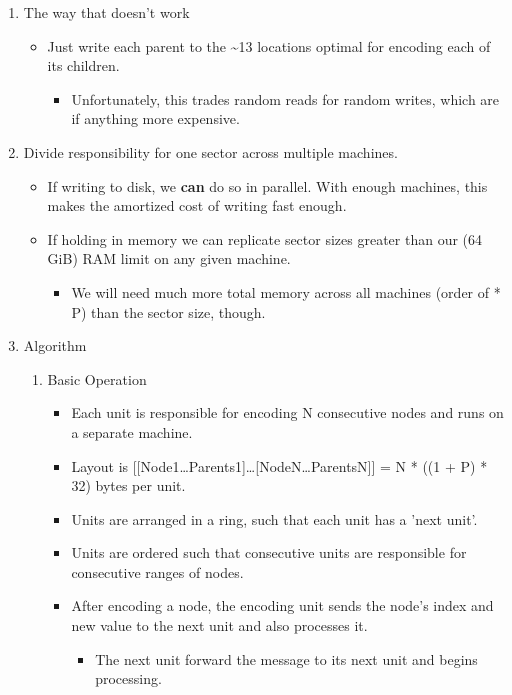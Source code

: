 \documentclass[11pt]{article}
\begin{document}
\begin{enumerate}
\item The way that doesn't work
\label{sec-1-3-1-1}
\begin{itemize}
\item Just write each parent to the \textasciitilde{}13 locations optimal for encoding each of its children.
\begin{itemize}
\item Unfortunately, this trades random reads for random writes, which are if anything more expensive.
\end{itemize}
\end{itemize}
\item Divide responsibility for one sector across multiple machines.
\label{sec-1-3-1-2}
\begin{itemize}
\item If writing to disk, we \textbf{can} do so in parallel. With enough machines, this makes the amortized cost of writing fast enough.
\item If holding in memory we can replicate sector sizes greater than our (64 GiB) RAM limit on any given machine.
\begin{itemize}
\item We will need much more total memory across all machines (order of * P) than the sector size, though.
\end{itemize}
\end{itemize}
\item Algorithm
\label{sec-1-3-1-3}
\begin{enumerate}
\item Basic Operation
\label{sec-1-3-1-3-1}
\begin{itemize}
\item Each unit is responsible for encoding N consecutive nodes and runs on a separate machine.
\item Layout is [[Node1\ldots{}Parents1]\ldots{}[NodeN\ldots{}ParentsN]] = N * ((1 + P) * 32) bytes per unit.
\item Units are arranged in a ring, such that each unit has a 'next unit'.
\item Units are ordered such that consecutive units are responsible for consecutive ranges of nodes.
\item After encoding a node, the encoding unit sends the node's index and new value to the next unit and also processes it.
\begin{itemize}
\item The next unit forward the message to its next unit and begins processing.

\end{itemize}
\end{itemize}
\end{enumerate}
\end{enumerate}
\end{document}

